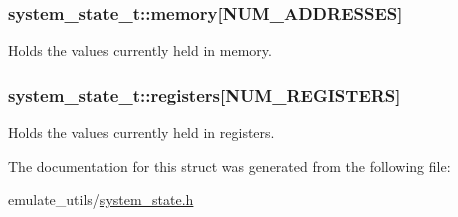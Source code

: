 \subsubsection[{\texorpdfstring{memory}{memory}}]{ system\+\_\+state\+\_\+t\+::memory\mbox{[}{\bf N\+U\+M\+\_\+\+A\+D\+D\+R\+E\+S\+S\+ES}\mbox{]}}\hypertarget{structsystem__state__t_ade4e6995025b3b8eeeb62bdb38408765}{}\label{structsystem__state__t_ade4e6995025b3b8eeeb62bdb38408765}
Holds the values currently held in memory. 
\subsubsection[{\texorpdfstring{registers}{registers}}]{ system\+\_\+state\+\_\+t\+::registers\mbox{[}{\bf N\+U\+M\+\_\+\+R\+E\+G\+I\+S\+T\+E\+RS}\mbox{]}}\hypertarget{structsystem__state__t_af042206b1a035449b5a10250fdc29e8f}{}\label{structsystem__state__t_af042206b1a035449b5a10250fdc29e8f}
Holds the values currently held in registers. 

The documentation for this struct was generated from the following file\+:\begin{DoxyCompactItemize}
\item 
emulate\+\_\+utils/\hyperlink{system__state_8h}{system\+\_\+state.\+h}\end{DoxyCompactItemize}
